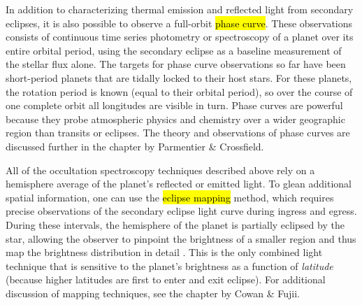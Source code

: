\documentclass[graybox,natbib,nosecnum]{svmult}
\newcommand{\hbindex}[1]{\hl{#1}\index{#1}}  %
\newcommand{\project}[1]{\textsl{#1}}
\newcommand{\HST}{\project{HST}}
\begin{document}
In addition to characterizing thermal emission and reflected light from secondary eclipses, it is also possible to observe a full-orbit \hbindex{phase curve}. These observations consists of continuous time series photometry or spectroscopy of a planet over its entire orbital period, using the secondary eclipse as a baseline measurement of the stellar flux alone.  The targets for phase curve observations so far have been short-period planets that are tidally locked to their host stars. For these planets, the rotation period is known (equal to their orbital period), so over the course of one complete orbit all longitudes are visible in turn.  Phase curves are powerful because they probe atmospheric physics and chemistry over a wider geographic region than transits or eclipses. The theory and observations of phase curves are discussed further in the chapter by Parmentier \& Crossfield. 


All of the occultation spectroscopy techniques described above rely on a hemisphere average of the planet's reflected or emitted light. To glean additional spatial information, one can use the \hbindex{eclipse mapping} method, which requires precise observations of the secondary eclipse light curve during ingress and egress.  During these intervals, the hemisphere of the planet is partially eclipsed by the star, allowing the observer to pinpoint the brightness of a smaller region and thus map the brightness distribution in detail \citep{rauscher07}.  This is the only combined light technique that is sensitive to the planet's brightness as a function of \emph{latitude} (because higher latitudes are first to enter and exit eclipse). For additional discussion of mapping techniques, see the chapter by Cowan \& Fujii.


\end{document}
